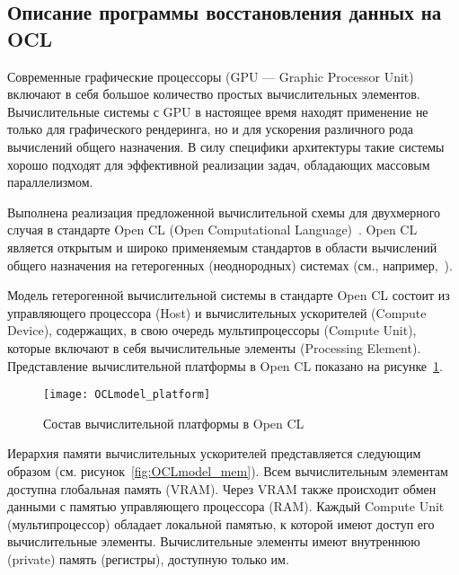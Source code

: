 

\label{sec:OCLprog}


\subsection*{Описание программы восстановления данных на OCL}


Современные графические процессоры (GPU --- Graphic Processor Unit)
включают в себя большое количество простых 
вычислительных элементов. %
Вычислительные системы с GPU в настоящее время находят применение не только для
графического рендеринга, но и для ускорения различного рода
вычислений общего назначения. 
В силу специфики архитектуры такие системы 
хорошо подходят для эффективной реализации задач,
обладающих массовым параллелизмом.

Выполнена реализация предложенной вычислительной схемы для
двухмерного случая в стандарте Open CL (Open Computational Language)~\cite{doc_OCL}.
Open CL является открытым и широко применяемым стандартов в области вычислений
общего назначения на гетерогенных (неоднородных) системах
(см., например,~\cite{paper_OCL_Komdiv}). %

Модель гетерогенной вычислительной системы в стандарте Open CL 
состоит из управляющего процессора (Host)
и вычислительных ускорителей (Compute Device),
содержащих, в свою очередь 
мультипроцессоры (Compute Unit),
которые включают в себя вычислительные элементы (Processing Element).
Представление вычислительной платформы в Open CL
показано на рисунке~\ref{fig:OCL_platform}.

\begin{figure}[h!]
  \centering
  \texttt{[image: OCLmodel\_platform]} 
  \caption{Состав вычислительной платформы в Open CL}
  \label{fig:OCL_platform}
\end{figure}
\FloatBarrier


Иерархия памяти вычислительных ускорителей представляется следующим образом
(см. рисунок~\ref{fig:OCLmodel_mem}).
Всем вычислительным элементам доступна глобальная память (VRAM).
Через VRAM также происходит обмен данными с памятью управляющего процессора (RAM). 
Каждый Compute Unit (мультипроцессор) обладает локальной памятью, к которой имеют доступ
его вычислительные элементы.
Вычислительные элементы имеют внутреннюю (private) память (регистры), доступную только им.

